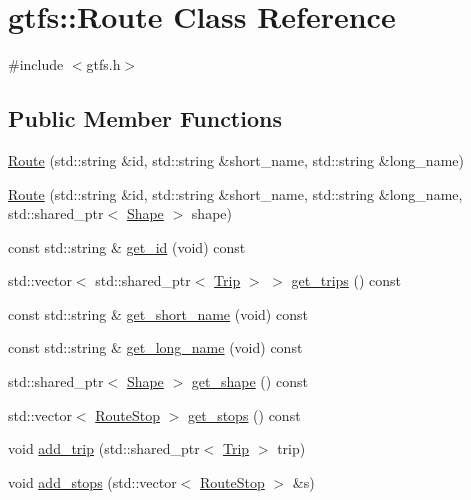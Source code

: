 \hypertarget{classgtfs_1_1Route}{}\section{gtfs\+:\+:Route Class Reference}
\label{classgtfs_1_1Route}


{\ttfamily \#include $<$gtfs.\+h$>$}

\subsection*{Public Member Functions}
\begin{DoxyCompactItemize}
\item 
\hyperlink{classgtfs_1_1Route_a32550fdfee780a26c596172184b86148}{Route} (std\+::string \&id, std\+::string \&short\+\_\+name, std\+::string \&long\+\_\+name)
\item 
\hyperlink{classgtfs_1_1Route_aa216efacee7f9eeab810e044894d3ec0}{Route} (std\+::string \&id, std\+::string \&short\+\_\+name, std\+::string \&long\+\_\+name, std\+::shared\+\_\+ptr$<$ \hyperlink{classgtfs_1_1Shape}{Shape} $>$ shape)
\item 
const std\+::string \& \hyperlink{classgtfs_1_1Route_a2d1ee4193b52ab7b8c7eb3160850cf71}{get\+\_\+id} (void) const
\item 
std\+::vector$<$ std\+::shared\+\_\+ptr$<$ \hyperlink{classgtfs_1_1Trip}{Trip} $>$ $>$ \hyperlink{classgtfs_1_1Route_a763ea7a09f20972019198515da6a1c05}{get\+\_\+trips} () const
\item 
const std\+::string \& \hyperlink{classgtfs_1_1Route_a2a0fcdf687d5e326b20c5043c9db874f}{get\+\_\+short\+\_\+name} (void) const
\item 
const std\+::string \& \hyperlink{classgtfs_1_1Route_aa943d312f934a91c3a56aec19d51cc90}{get\+\_\+long\+\_\+name} (void) const
\item 
std\+::shared\+\_\+ptr$<$ \hyperlink{classgtfs_1_1Shape}{Shape} $>$ \hyperlink{classgtfs_1_1Route_a4d3d7b29be342ae806041801327762a8}{get\+\_\+shape} () const
\item 
std\+::vector$<$ \hyperlink{structgtfs_1_1RouteStop}{Route\+Stop} $>$ \hyperlink{classgtfs_1_1Route_a6992a39502af9d8bcc8bb6bb12d93b1f}{get\+\_\+stops} () const
\item 
void \hyperlink{classgtfs_1_1Route_aa8a666e5a8f197835764874c983e6601}{add\+\_\+trip} (std\+::shared\+\_\+ptr$<$ \hyperlink{classgtfs_1_1Trip}{Trip} $>$ trip)
\item 
void \hyperlink{classgtfs_1_1Route_a8beb0325039a69e1d34e9dcc431e047e}{add\+\_\+stops} (std\+::vector$<$ \hyperlink{structgtfs_1_1RouteStop}{Route\+Stop} $>$ \&s)
\end{DoxyCompactItemize}


